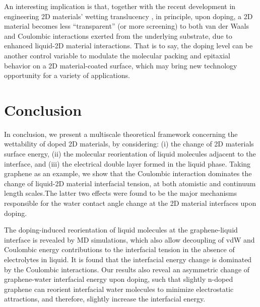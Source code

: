 \documentclass[journal=jacsat,manuscript=article,email=true]{achemso}
\begin{document}
An interesting implication is that, together with the recent
development in engineering 2D materials’ wetting translucency
\cite{raj_wettability_2013,rafiee_wetting_2012,shih_breakdown_2012,shih_wetting_2013},
in principle, upon doping, a 2D material becomes less “transparent” (or more screening)
to both van der Waals and Coulombic interactions exerted from the underlying
substrate, due to enhanced liquid-2D material interactions. That is to say, the doping level can be
another control variable to modulate the molecular packing and
epitaxial behavior on a 2D material-coated surface, which may bring
new technology opportunity for a variety of applications.


\section{Conclusion}
\label{sec:org333a0f3}

In conclusion, we present a multiscale theoretical framework
concerning the wettability of doped 2D materials, by considering: (i)
the change of 2D materials surface energy, (ii) the molecular
reorientation of liquid molecules adjacent to the interface, and (iii)
the electrical double layer formed in the liquid phase. Taking
graphene as an example, we show that the Coulombic interaction
dominates the change of liquid-2D material interfacial tension, at
both atomistic and continuum length scales.The latter two effects were
found to be the major mechanisms responsible for the water contact angle
change at the 2D material interfaces upon doping.

The doping-induced reorientation of liquid molecules at the
graphene-liquid interface is revealed by MD simulations, which also
allow decoupling of vdW and Coulombic energy contributions to the
interfacial tension in the absence of electrolytes in liquid. It is
found that the interfacial energy change is dominated by the Coulombic
interactions. Our results also reveal an asymmetric change of
graphene-water interfacial energy upon doping, such that slightly
n-doped graphene can reorient interfacial water molecules to minimize
electrostatic attractions, and therefore, slightly increase the
interfacial energy.
\end{document}
